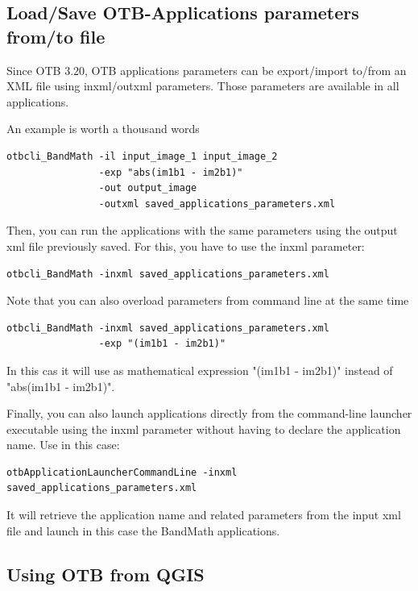 \subsection{Load/Save OTB-Applications parameters from/to file}

Since OTB 3.20, OTB applications parameters can be export/import to/from an XML
file using inxml/outxml parameters. Those parameters are available in all
applications.

An example is worth a thousand words

\begin{verbatim}
otbcli_BandMath -il input_image_1 input_image_2
                -exp "abs(im1b1 - im2b1)"
                -out output_image
                -outxml saved_applications_parameters.xml
\end{verbatim}

Then, you can run the applications with the same parameters using the output xml
file previously saved. For this, you have to use the inxml parameter:

\begin{verbatim}
otbcli_BandMath -inxml saved_applications_parameters.xml
\end{verbatim}

Note that you can also overload parameters from command line at the same time

\begin{verbatim}
otbcli_BandMath -inxml saved_applications_parameters.xml
                -exp "(im1b1 - im2b1)"
\end{verbatim}

In this cas it will use as mathematical expression "(im1b1 - im2b1)" instead
of "abs(im1b1 - im2b1)".

Finally, you can also launch applications directly from the command-line launcher executable using
the inxml parameter without having to declare the application name. Use in this case:

\begin{verbatim}
otbApplicationLauncherCommandLine -inxml saved_applications_parameters.xml
\end{verbatim}

It will retrieve the application name and related parameters from the input xml
file and launch in this case the BandMath applications.

\subsection{Using OTB from QGIS}

